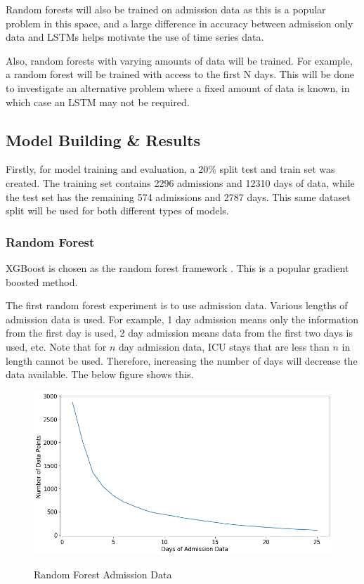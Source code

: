 \documentclass[12pt]{article}
\begin{document}
Random forests will also be trained on admission data as this is a popular problem in this space, and a large difference in accuracy between admission only data and LSTMs helps motivate the use of time series data. 

Also, random forests with varying amounts of data will be trained. For example, a random forest will be trained with access to the first N days. This will be done to investigate an alternative problem where a fixed amount of data is known, in which case an LSTM may not be required. 

\subsection{Model Building \& Results}

Firstly, for model training and evaluation, a 20\% split test and train set was created. The training set contains 2296 admissions and 12310 days of data, while the test set has the remaining 574 admissions and 2787 days. This same dataset split will be used for both different types of models. 

\subsubsection{Random Forest}
XGBoost is chosen as the random forest framework \cite{XGBoost}. This is a popular gradient boosted method. 

The first random forest experiment is to use admission data. Various lengths of admission data is used. For example, 1 day admission means only the information from the first day is used, 2 day admission means data from the first two days is used, etc. Note that for $n$ day admission data, ICU stays that are less than $n$ in length cannot be used. Therefore, increasing the number of days will decrease the data available. The below figure shows this.

\begin{figure}[H]
\centering\caption{Random Forest Admission Data}
\includegraphics[scale=0.45]{Random Forest Admission Data.png}
\label{Random Forest Admission Data}
\end{figure}
\end{document}

